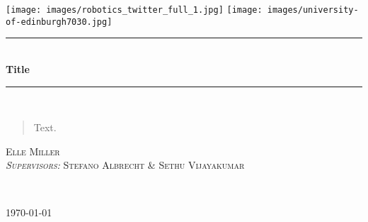 \begin{titlepage}

\newcommand{\HRule}{\rule{\linewidth}{0.5mm}} 

\texttt{[image: images/robotics\_twitter\_full\_1.jpg]}
\hfill
\texttt{[image: images/university-of-edinburgh7030.jpg]}\\
[2cm]

\center 
{\small


\HRule \\[0.4cm]
{ \large \bfseries Title}\\[0.4cm] 
\HRule \\[2cm]

\begin{abstract}
    Text. 
\end{abstract}

\begin{minipage}{0.9\textwidth}
  \Large
  \centering
  \vspace{3cm}
  \textsc{Elle Miller}\\
  \vspace{20pt}
  \textsc{\small \textit{Supervisors:} Stefano Albrecht \& Sethu Vijayakumar}\\
\end{minipage}
~
\vspace{20pt}

{\large \today}\\[0.5cm]

}
\end{titlepage}
